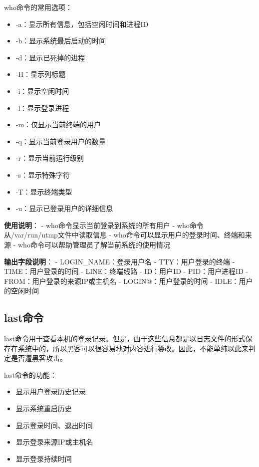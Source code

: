 \documentclass[12pt,UTF8]{ctexbook}
\begin{document}
who命令的常用选项：
\begin{itemize}
    \item -a：显示所有信息，包括空闲时间和进程ID
    \item -b：显示系统最后启动的时间
    \item -d：显示已死掉的进程
    \item -H：显示列标题
    \item -i：显示空闲时间
    \item -l：显示登录进程
    \item -m：仅显示当前终端的用户
    \item -q：显示当前登录用户的数量
    \item -r：显示当前运行级别
    \item -s：显示特殊字符
    \item -T：显示终端类型
    \item -u：显示已登录用户的详细信息
\end{itemize}

\textbf{使用说明}：
- who命令显示当前登录到系统的所有用户
- who命令从/var/run/utmp文件中读取信息
- who命令可以显示用户的登录时间、终端和来源
- who命令可以帮助管理员了解当前系统的使用情况

\textbf{输出字段说明}：
- LOGIN\_NAME：登录用户名
- TTY：用户登录的终端
- TIME：用户登录的时间
- LINE：终端线路
- ID：用户ID
- PID：用户进程ID
- FROM：用户登录的来源IP或主机名
- LOGIN@：用户登录的时间
- IDLE：用户的空闲时间

\subsection{last命令}
last命令用于查看本机的登录记录。但是，由于这些信息都是以日志文件的形式保存在系统中的，所以黑客可以很容易地对内容进行篡改。因此，不能单纯以此来判定是否遭黑客攻击。

last命令的功能：
\begin{itemize}
    \item 显示用户登录历史记录
    \item 显示系统重启历史
    \item 显示登录时间、退出时间
    \item 显示登录来源IP或主机名
    \item 显示登录持续时间
\end{itemize}
\end{document}
